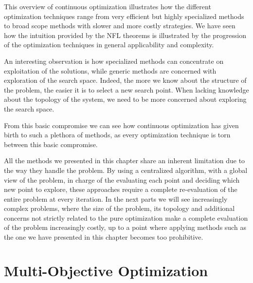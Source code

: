 This overview of continuous optimization illustrates how the different optimization techniques range from very efficient but highly specialized methods to broad scope methods with slower and more costly strategies.
We have seen how the intuition provided by the NFL theorems is illustrated by the progression of the optimization techniques in general applicability and complexity.

An interesting observation is how specialized methods can concentrate on exploitation of the solutions, while generic methods are concerned with exploration of the search space. Indeed, the more we know about the structure of the problem, the easier it is to select a new search point. When lacking knowledge about the topology of the system, we need to be more concerned about exploring the search space.

From this basic compromise we can see how continuous optimization has given birth to such a plethora of methods, as every optimization technique is torn between this basic compromise.

All the methods we presented in this chapter share an inherent limitation due to the way they handle the problem. By using a centralized algorithm, with a global view of the problem, in charge of the evaluating each point and deciding which new point to explore, these approaches require a complete re-evaluation of the entire problem at every iteration. In the next parts we will see increasingly complex problems, where the size of the problem, its topology and additional concerns not strictly related to the pure optimization make a complete evaluation of the problem increasingly costly, up to a point where applying methods such as the one we have presented in this chapter becomes too prohibitive.

\chapter{Multi-Objective Optimization}

